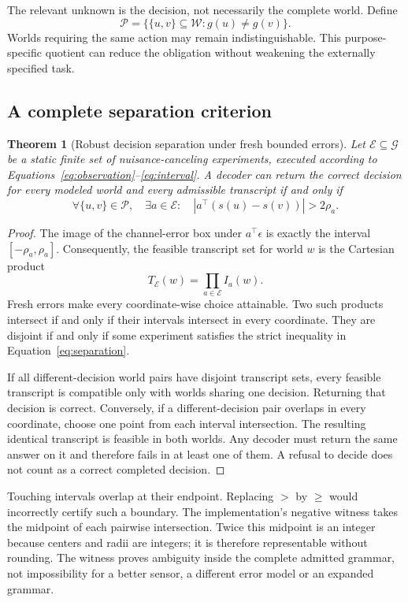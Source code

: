 \documentclass[11pt,letterpaper]{article}
\newtheorem{theorem}{Theorem}[section]
\theoremstyle{definition}\newtheorem{definition}[theorem]{Definition}
\theoremstyle{remark}\newtheorem{remark}[theorem]{Remark}
\newcommand{\W}{\mathcal W}
\newcommand{\G}{\mathcal G}
\newcommand{\E}{\mathcal E}
\newcommand{\Pairs}{\mathcal P}
\begin{document}
The relevant unknown is the decision, not necessarily the complete world. Define
\[
 \Pairs=\{\{u,v\}\subseteq\W:g(u)\ne g(v)\}.
\]
Worlds requiring the same action may remain indistinguishable. This purpose-specific quotient can reduce the obligation without weakening the externally specified task.

\subsection{A complete separation criterion}
\begin{theorem}[Robust decision separation under fresh bounded errors]
\label{thm:separation}
Let \(\E\subseteq\G\) be a static finite set of nuisance-canceling experiments, executed according to Equations~\eqref{eq:observation}--\eqref{eq:interval}. A decoder can return the correct decision for every modeled world and every admissible transcript if and only if
\begin{equation}
 \forall\{u,v\}\in\Pairs,\quad
 \exists a\in\E:\quad
 |a^\top(s(u)-s(v))|>2\rho_a .
 \label{eq:separation}
\end{equation}
\end{theorem}
\begin{proof}
The image of the channel-error box under \(a^\top\epsilon\) is exactly the interval \([-\rho_a,\rho_a]\). Consequently, the feasible transcript set for world \(w\) is the Cartesian product
\[
 T_{\E}(w)=\prod_{a\in\E} I_a(w).
\]
Fresh errors make every coordinate-wise choice attainable. Two such products intersect if and only if their intervals intersect in every coordinate. They are disjoint if and only if some experiment satisfies the strict inequality in Equation~\eqref{eq:separation}.

If all different-decision world pairs have disjoint transcript sets, every feasible transcript is compatible only with worlds sharing one decision. Returning that decision is correct. Conversely, if a different-decision pair overlaps in every coordinate, choose one point from each interval intersection. The resulting identical transcript is feasible in both worlds. Any decoder must return the same answer on it and therefore fails in at least one of them. A refusal to decide does not count as a correct completed decision.
\end{proof}

Touching intervals overlap at their endpoint. Replacing \(>\) by \(\geq\) would incorrectly certify such a boundary. The implementation's negative witness takes the midpoint of each pairwise intersection. Twice this midpoint is an integer because centers and radii are integers; it is therefore representable without rounding. The witness proves ambiguity inside the complete admitted grammar, not impossibility for a better sensor, a different error model or an expanded grammar.
\end{document}
